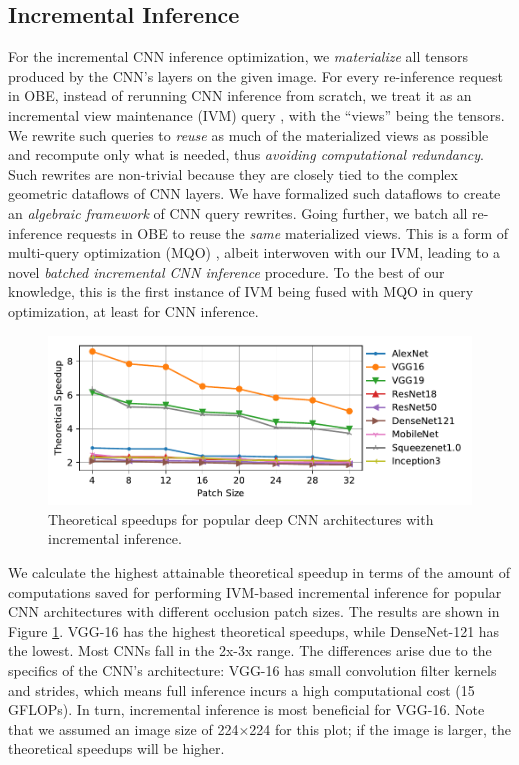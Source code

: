 \documentclass{vldb}
\begin{document}
\subsection{Incremental Inference}
For the incremental CNN inference optimization, we \textit{materialize} all tensors produced by the CNN's layers on the given image. For every re-inference request in OBE, instead of rerunning CNN inference from scratch, we treat it as an incremental view maintenance (IVM) query \cite{chirkova2012materialized}, with the ``views'' being the tensors. We rewrite such queries to \textit{reuse} as much of the materialized views as possible and recompute only what is needed, thus \textit{avoiding computational redundancy}. Such rewrites are non-trivial because they are closely tied to the complex geometric dataflows of CNN layers. We have formalized such dataflows to create an \textit{algebraic framework} of CNN query rewrites. Going further, we batch all re-inference requests in OBE to reuse the \textit{same} materialized views. This is a form of multi-query optimization (MQO) \cite{sellis1988multiple}, albeit interwoven with our IVM, leading to a novel \textit{batched incremental CNN inference} procedure. To the best of our knowledge, this is the first instance of IVM being fused with MQO in query optimization, at least for CNN inference.

\begin{figure}
\includegraphics[width=\columnwidth]{images/redundancy_ratio.pdf}
\caption{Theoretical speedups for popular deep CNN architectures with incremental inference.}
\label{fig:theoretical_speedups}
\vspace{-2mm}
\end{figure}

We calculate the highest attainable theoretical speedup in terms of the amount of computations saved for performing IVM-based incremental inference for popular CNN architectures with different occlusion patch sizes.
The results are shown in Figure \ref{fig:theoretical_speedups}.
VGG-16 has the highest theoretical speedups, while DenseNet-121 has the lowest. Most CNNs fall in the 2x-3x range.
The differences arise due to the specifics of the CNN's architecture: VGG-16 has small convolution filter kernels and strides, which means full inference incurs a high computational cost (15 GFLOPs). In turn, incremental inference is most beneficial for VGG-16.
Note that we assumed an image size of 224$\times$224 for this plot; if the image is larger, the theoretical speedups will be higher.
\end{document}
